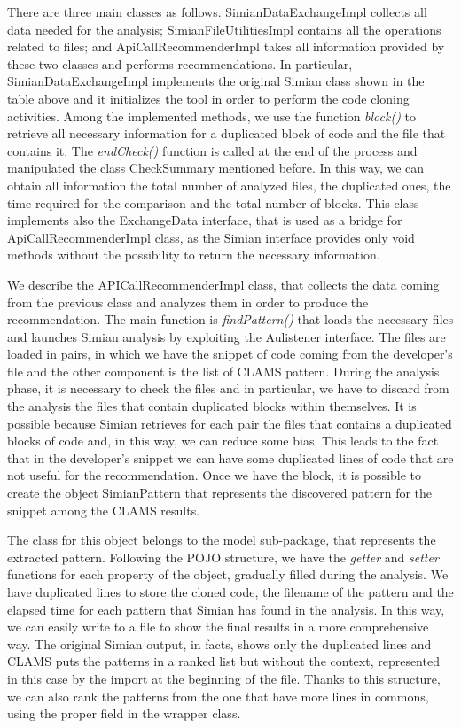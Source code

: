 
There are three main classes as follows. SimianDataExchangeImpl collects all data needed for the analysis; SimianFileUtilitiesImpl contains all the operations related to files; and ApiCallRecommenderImpl takes all information provided by these two classes and performs recommendations. In particular, SimianDataExchangeImpl implements the original Simian class shown in the table above and it initializes the tool in order to perform the code cloning activities. Among the implemented methods, we use the function \textit{block()} to retrieve all necessary information for a duplicated block of code and the file that contains it. The \textit{endCheck()} function is called at the end of the process and manipulated the class CheckSummary mentioned before. In this way, we can obtain all information the total number of analyzed files, the duplicated ones, the time required for the comparison and the total number of blocks. This class implements also the ExchangeData interface, that is used as a bridge for ApiCallRecommenderImpl class, as the Simian interface provides only void methods without the possibility to return the necessary information.

We describe the APICallRecommenderImpl class, that collects the data coming from the previous class and analyzes them in order to produce the recommendation. The main function is \textit{findPattern()} that loads the necessary files and launches Simian analysis by exploiting the Aulistener interface. The files are loaded in pairs, in which we have the snippet of code coming from the developer's file and the other component is the list of CLAMS pattern. During the analysis phase, it is necessary to check the files and in particular, we have to discard from the analysis the files that contain duplicated blocks within themselves. It is possible because Simian retrieves for each pair the files that contains a duplicated blocks of code and, in this way, we can reduce some bias. This leads to the fact that in the developer's snippet we can have some duplicated lines of code that are not useful for the recommendation. Once we have the block, it is possible to create the object SimianPattern that represents the discovered pattern for the snippet among the CLAMS results.

The class for this object belongs to the model sub-package, that represents the extracted pattern. Following the POJO structure, we have the \textit{getter} and \textit{setter} functions for each property of the object, gradually filled during the analysis. We have duplicated lines to store the cloned code, the filename of the pattern and the elapsed time for each pattern that Simian has found in the analysis. In this way, we can easily write to a file to show the final results in a more comprehensive way. The original Simian output, in facts, shows only the duplicated lines and CLAMS puts the patterns in a ranked list but without the context, represented in this case by the import at the beginning of the file. Thanks to this structure, we can also rank the patterns from the one that have more lines in commons, using the proper field in the wrapper class.

